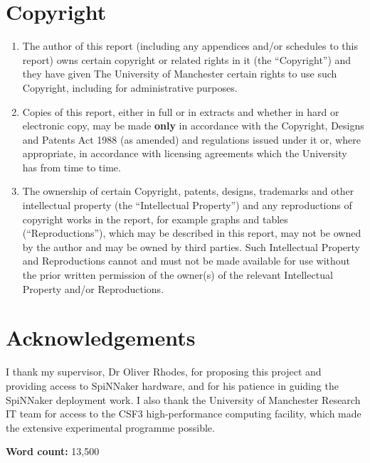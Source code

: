 \documentclass[12pt,a4paper,oneside]{report}
\begin{document}
\chapter*{Copyright}
\begin{enumerate}[label=\roman*.]
\item The author of this report (including any appendices and/or schedules to this report) owns certain copyright or related rights in it (the ``Copyright'') and they have given The University of Manchester certain rights to use such Copyright, including for administrative purposes.
\item Copies of this report, either in full or in extracts and whether in hard or electronic copy, may be made \textbf{only} in accordance with the Copyright, Designs and Patents Act 1988 (as amended) and regulations issued under it or, where appropriate, in accordance with licensing agreements which the University has from time to time.
\item The ownership of certain Copyright, patents, designs, trademarks and other intellectual property (the ``Intellectual Property'') and any reproductions of copyright works in the report, for example graphs and tables (``Reproductions''), which may be described in this report, may not be owned by the author and may be owned by third parties. Such Intellectual Property and Reproductions cannot and must not be made available for use without the prior written permission of the owner(s) of the relevant Intellectual Property and/or Reproductions.
\end{enumerate}

\chapter*{Acknowledgements}
I thank my supervisor, Dr Oliver Rhodes, for proposing this project and providing access to SpiNNaker hardware, and for his patience in guiding the SpiNNaker deployment work. I also thank the University of Manchester Research IT team for access to the CSF3 high-performance computing facility, which made the extensive experimental programme possible.

\vspace{2cm}
\noindent\textbf{Word count:} 13,500

\tableofcontents
\listoffigures
\listoftables

\printglossary[type=\acronymtype,title=Abbreviations]
\end{document}

